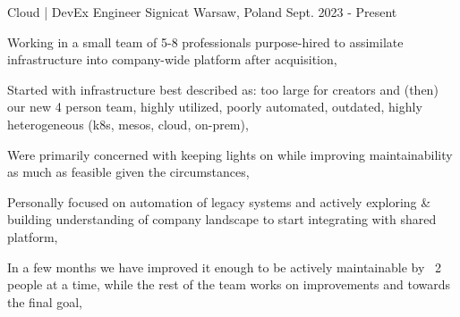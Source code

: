

\begin{cventries}

  \cventry
  {Cloud | DevEx Engineer} %
  {Signicat} %
  {Warsaw, Poland} %
  {Sept. 2023 - Present} %
  {
    \begin{cvitems} %
      \item {Working in a small team of 5-8 professionals purpose-hired to assimilate infrastructure into company-wide platform after acquisition,}
      \item {Started with infrastructure best described as: too large for creators and (then) our new 4 person team, highly utilized, poorly automated, outdated, highly heterogeneous (k8s, mesos, cloud, on-prem),}
      \item {Were primarily concerned with keeping lights on while improving maintainability as much as feasible given the circumstances,}
      \item {Personally focused on automation of legacy systems and actively exploring \& building understanding of company landscape to start integrating with shared platform,}
      \item {In a few months we have improved it enough to be actively maintainable by ~2 people at a time, while the rest of the team works on improvements and towards the final goal,}
    \end{cvitems}
  }


\end{cventries}
